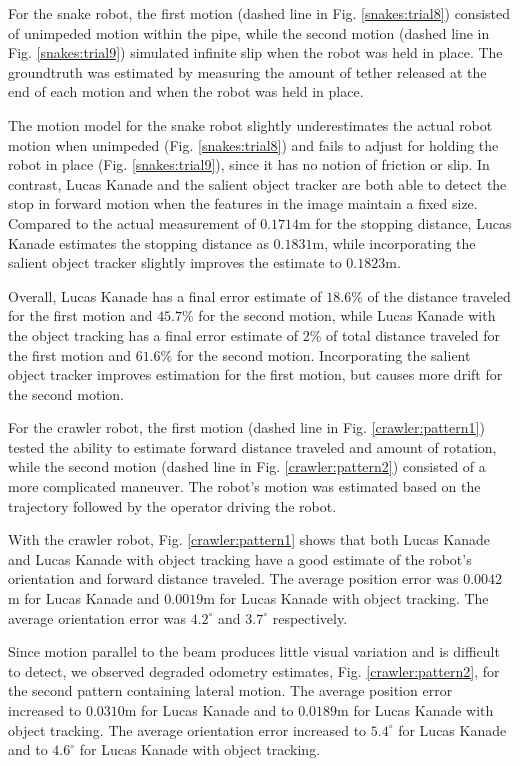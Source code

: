 \documentclass[letterpaper, 10 pt, conference]{ieeeconf}
\begin{document}
For the snake robot, the first motion (dashed line in Fig. \ref{snakes:trial8}) consisted of unimpeded motion within the pipe, while the second motion (dashed line in Fig. \ref{snakes:trial9}) simulated infinite slip when the robot was held in place. The groundtruth was estimated by measuring the amount of tether released at the end of each motion and when the robot was held in place.

The motion model for the snake robot slightly underestimates the actual robot motion when unimpeded (Fig. \ref{snakes:trial8}) and fails to adjust for holding the robot in place (Fig. \ref{snakes:trial9}), since it has no notion of friction or slip. In contrast, Lucas Kanade and the salient object tracker are both able to detect the stop in forward motion when the features in the image maintain a fixed size. Compared to the actual measurement of  $0.1714$m for the stopping distance, Lucas Kanade estimates the stopping distance as $0.1831$m, while incorporating the salient object tracker slightly improves the estimate to $0.1823$m. 

Overall, Lucas Kanade has a final error estimate of $18.6 \%$ of the distance traveled for the first motion and $45.7 \%$ for the second motion, while Lucas Kanade with the object tracking has a final error estimate of $2 \%$ of total distance traveled for the first motion and $61.6 \%$ for the second motion. Incorporating the salient object tracker improves estimation for the first motion, but causes more drift for the second motion.

For the crawler robot, the first motion (dashed line in Fig. \ref{crawler:pattern1}) tested the ability to estimate forward distance traveled and amount of rotation, while the second motion  (dashed line in Fig. \ref{crawler:pattern2}) consisted of a more complicated maneuver. The robot's motion was estimated based on the trajectory followed by the operator driving the robot.

With the crawler robot, Fig. \ref{crawler:pattern1} shows that both Lucas Kanade and Lucas Kanade with object tracking have a good estimate of the robot's orientation and forward distance traveled. The average position error was $0.0042$m for Lucas Kanade and $0.0019$m for Lucas Kanade with object tracking. The average orientation error was $4.2^{\circ}$ and $3.7^{\circ}$ respectively. 

Since motion parallel to the beam produces little visual variation and is difficult to detect, we observed degraded odometry estimates, Fig. \ref{crawler:pattern2}, for the second pattern containing lateral motion. The average position error increased to $0.0310$m for Lucas Kanade and to $0.0189$m for Lucas Kanade with object tracking. The average orientation error increased to $5.4^{\circ}$ for Lucas Kanade and to $4.6^{\circ}$ for Lucas Kanade with object tracking.
\end{document}
